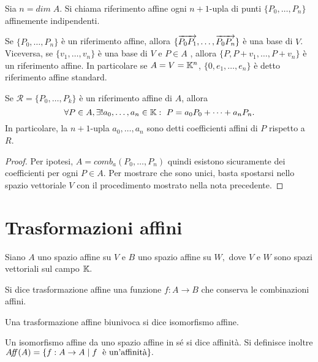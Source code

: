  \begin{definition}
 Sia $n=dim\;A$. Si chiama riferimento affine ogni $n+1$-upla di punti $\{P_0,\dots, P_n\}$ affinemente indipendenti.
 \end{definition}
 
 \begin{remark}
 Se $\{P_0,\dots, P_n\}$ è un riferimento affine, allora
 $\{\overrightarrow{P_0P_1},\dots,\overrightarrow{P_0P_n}\}$ è una base di $V$. Viceversa, se $\{v_1,\dots,v_n\}$ è una base di
 $V$ e $P\in A$ , allora $\{P,P+v_1,\dots,P+v_n\}$ è un riferimento affine. In particolare se
 $A=V=\mathbb K^n$, $\{0,e_1,\dots,e_n\}$ è detto riferimento affine standard.
 \end{remark}
 
 \begin{proposition}
 Se $\mathcal{R}=\{P_0,\dots,P_k\}$ è un riferimento affine di $A$, allora
 \[
	\forall P\in A, \exists ! a_0,\dots,a_n\in \mathbb K :\ P=a_0P_0+\dots+a_nP_n.
 \]
 In particolare, la $n+1$-upla $a_0,\dots,a_n$ sono detti coefficienti affini di $P$
 rispetto a $R$.
 \end{proposition}
 
 \begin{proof}
 Per ipotesi, $A=comb_a(P_0,\dots,P_n)$ quindi esistono sicuramente dei coefficienti per ogni
 $P\in A$. Per mostrare che sono unici, basta spostarsi nello spazio vettoriale
 $V$ con il procedimento mostrato nella nota precedente.
 \end{proof}

	\section{Trasformazioni affini}
	
 Siano $A$ uno spazio affine su $V$ e $B$ uno spazio affine su $W,$ dove $V$ e
 $W$ sono spazi vettoriali sul campo $\mathbb K.$
 
 \begin{definition}
 Si dice trasformazione affine una funzione $f:A\to B$ che conserva le combinazioni affini.
 \end{definition}
 
 \begin{definition}
 Una trasformazione affine biunivoca si dice isomorfismo affine.
 \end{definition}
 
 \begin{definition}
 Un isomorfismo affine da uno spazio affine in sé si dice affinità. Si definisce inoltre
 $A\!f\!\!f(A)=\{f:A\to A\;|\; f\; \text{ è un'affinità}\}.$
 \end{definition}
 
